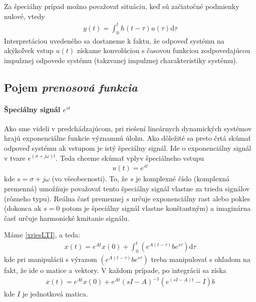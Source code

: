 \documentclass[a4paper, 10pt, ]{article}
\begin{document}
\bigskip

Za špeciálny prípad možno považovať situáciu, keď sú začiatočné podmienky nulové, vtedy
\begin{align}
	y(t) = \int_0^t h(t - \tau) u(\tau) \text{d}\tau
\end{align}
Interpretáciou uvedeného sa dostaneme k faktu, že odpoveď systému na akýkoľvek vstup $u(t)$ získame konvolúciou s časovou funkciou zodpovedajúcou impulznej odpovede systému (takzvanej impulznej charakteristiky systému).


\subsection{Pojem \emph{prenosová funkcia}}

\paragraph{Špeciálny signál $e^{st}$}


Ako sme videli v predchádzajúcom, pri riešení lineárnych dynamických systémov hrajú exponenciálne funkcie významnú úlohu. Ako dôležité sa preto črtá skúmať odpoveď systému ak vstupom je istý špeciálny signál. Ide o exponenciálny signál v tvare $e^{(\sigma + j\omega)t}$. Teda chceme skúmať vplyv špeciálneho vstupu
\begin{align}
	u(t) = e^{st}
\end{align}
kde $s = \sigma + j\omega$ (vo všeobecnosti). To, že $s$ je komplexné číslo (komplexná premenná) umožňuje považovať tento špeciálny signál vlastne za triedu signálov (rôzneho typu). Reálna časť premennej $s$ určuje exponenciálny rast alebo pokles (dokonca ak $s = 0$ potom je špeciálny signál vlastne konštantným) a imaginárna časť určuje harmonické kmitanie signálu.

Máme \eqref{xriesLTI}, a teda:
\begin{align}
	x(t) = e^{At} x(0) + \int_0^t \left( e^{A(t-\tau)} b e^{s\tau} \right) \text{d}\tau
\end{align}
kde pri manipulácii s výrazom $ \left( e^{A(t-\tau)} b e^{s\tau} \right)$ treba manipulovať s ohľadom na fakt, že ide o matice a vektory. V každom prípade, po integrácii sa získa
\begin{align}
	x(t) = e^{At} x(0) + e^{At} \left( sI - A \right)^{-1}  \left( e^{(sI-A)t} - I \right) b
\end{align}
kde $I$ je jednotková matica.
\end{document}
